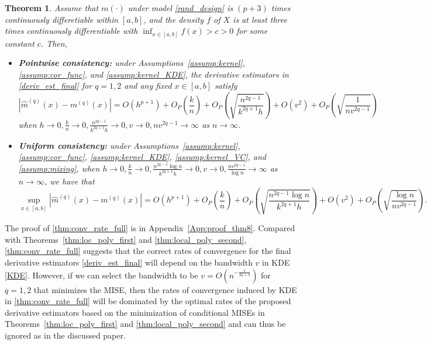 \documentclass{uwstat572}
\newtheorem{theorem}{Theorem}
\theoremstyle{definition}
\renewcommand{\hat}{\widehat}
\theoremstyle{theorem}
\begin{document}
\begin{theorem}
\label{thm:conv_rate_full}
Assume that $m(\cdot)$ under model \eqref{rand_design} is $(p+3)$ times continuously differetiable within $[a,b]$, and the density $f$ of $X$ is at least three times continuously differentiable with $\inf_{x\in [a,b]} f(x) > c >0$ for some constant $c$. Then,
\begin{itemize}
	\item {\bf Pointwise consistency:} under Assumptions~\ref{assump:kernel}, \ref{assump:cor_func}, and \ref{assump:kernel_KDE}, the derivative estimators in \eqref{deriv_est_final} for $q=1,2$ and any fixed $x\in [a,b]$ satisfy
	$$\left|\hat{m}^{(q)}(x) - m^{(q)}(x)\right| = O\left(h^{p+1}\right) +O_P\left(\frac{k}{n}\right) + O_P\left(\sqrt{\frac{n^{2q-1}}{k^{2q+1}h}}\right) + O(v^2) + O_P\left(\sqrt{\frac{1}{nv^{2q-1}}}\right)$$
	when $h\to 0, \frac{k}{n} \to 0, \frac{n^{2q-1}}{k^{2q+1}h} \to 0, v\to 0, nv^{2q-1} \to \infty$ as $n\to \infty$.
	
	\item {\bf Uniform consistency:} under Assumptions~\ref{assump:kernel}, \ref{assump:cor_func}, \ref{assump:kernel_KDE}, \ref{assump:kernel_VC}, and \ref{assump:mixing}, when $h\to 0, \frac{k}{n} \to 0, \frac{n^{2q-1}\log n}{k^{2q+1}h} \to 0, v\to 0, \frac{nv^{2q-1}}{\log n} \to \infty$ as $n\to \infty$, we have that
	$$\sup_{x\in [a,b]}\left|\hat{m}^{(q)}(x) - m^{(q)}(x) \right| = O\left(h^{p+1}\right) +O_P\left(\frac{k}{n}\right) + O_P\left(\sqrt{\frac{n^{2q-1}\log n}{k^{2q+1}h}}\right) + O(v^2) + O_P\left(\sqrt{\frac{\log n}{nv^{2q-1}}}\right).$$
\end{itemize}
\end{theorem}

\noindent The proof of \autoref{thm:conv_rate_full} is in Appendix~\ref{App:proof_thm8}. Compared with Theorems~\ref{thm:loc_poly_first} and \ref{thm:local_poly_second}, \autoref{thm:conv_rate_full} suggests that the correct rates of convergence for the final derivative estimators \eqref{deriv_est_final} will depend on the bandwidth $v$ in KDE \eqref{KDE}. However, if we can select the bandwidth to be $v=O\left(n^{-\frac{1}{2q+3}}\right)$ for $q=1,2$ that minimizes the MISE, then the rates of convergence induced by KDE in \autoref{thm:conv_rate_full} will be dominated by the optimal rates of the proposed derivative estimators based on the minimization of conditional MISEs in Theorems~\ref{thm:loc_poly_first} and \ref{thm:local_poly_second} and can thus be ignored as in the discussed paper.
\end{document}
